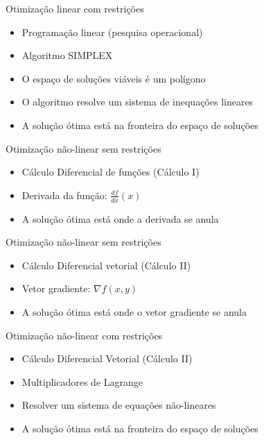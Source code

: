 \documentclass{beamer}
\begin{document}
\begin{frame}{Otimização linear com restrições}
  \begin{itemize}
  \item Programação linear (pesquisa operacional)
  \item Algoritmo SIMPLEX
  \item O espaço de soluções viáveis é um polígono
  \item O algoritmo resolve um sistema de inequações lineares
  \item A solução ótima está na fronteira do espaço de soluções
  \end{itemize}
\end{frame}

\begin{frame}{Otimização não-linear sem restrições}
  \begin{itemize}
  \item Cálculo Diferencial de funções (Cálculo I)
  \item Derivada da função: $\frac{d f}{d x}(x)$
  \item A solução ótima está onde a derivada se anula
  \end{itemize}
\end{frame}

\begin{frame}{Otimização não-linear sem restrições}
  \begin{itemize}
  \item Cálculo Diferencial vetorial (Cálculo II)
  \item Vetor gradiente: $\nabla f(x,y)$
  \item A solução ótima está onde o vetor gradiente se anula
  \end{itemize}
\end{frame}

\begin{frame}{Otimização não-linear com restrições}
  \begin{itemize}
  \item Cálculo Diferencial Vetorial (Cálculo II)
  \item Multiplicadores de Lagrange
  \item Resolver um sistema de equações não-lineares
  \item A solução ótima está na fronteira do espaço de soluções
  \end{itemize}
\end{frame}
\end{document}
